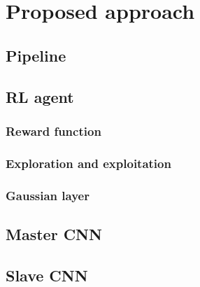 \chapter{Proposed approach}

\section{Pipeline}
\section{RL agent}
\subsection{Reward function}
\subsection{Exploration and exploitation}
\subsection{Gaussian layer}
\section{Master CNN}
\section{Slave CNN}
